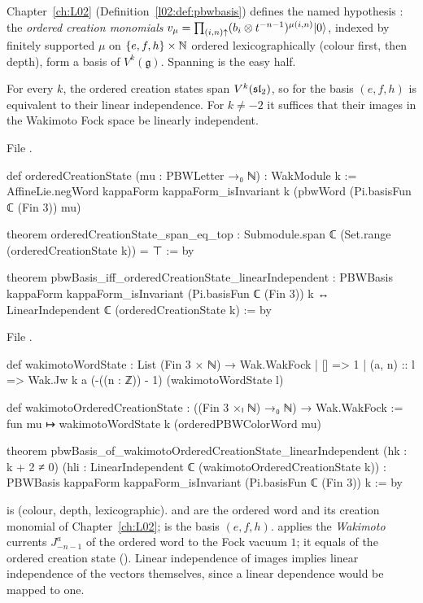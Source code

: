 Chapter~\ref{ch:L02} (Definition~\ref{l02:def:pbwbasis}) defines the named hypothesis
: the \emph{ordered creation monomials}
$v_\mu = \prod_{(i,n)\uparrow}(b_i\otimes t^{-n-1})^{\mu(i,n)}|0\rangle$, indexed by finitely supported
$\mu$ on $\{e,f,h\}\times{\mathbb{N}}$ ordered lexicographically (colour first, then depth), form a basis of
$V^k(\mathfrak g)$. Spanning is the easy half.

\begin{proposition}\label{l08:prop:pbwreduce}
For every $k$, the ordered creation states span $V^k(\mathfrak{sl}_2)$, so  for the basis
$(e,f,h)$ is equivalent to their linear independence. For $k\ne-2$ it suffices that their images in
the Wakimoto Fock space be linearly independent.
\end{proposition}

\noindent File .
\begin{leancode}
def orderedCreationState (mu : PBWLetter →₀ ℕ) : WakModule k :=
  AffineLie.negWord kappaForm kappaForm_isInvariant k
    (pbwWord (Pi.basisFun ℂ (Fin 3)) mu)

theorem orderedCreationState_span_eq_top :
    Submodule.span ℂ (Set.range (orderedCreationState k)) = ⊤ := by

theorem pbwBasis_iff_orderedCreationState_linearIndependent :
    PBWBasis kappaForm kappaForm_isInvariant (Pi.basisFun ℂ (Fin 3)) k ↔
      LinearIndependent ℂ (orderedCreationState k) := by
\end{leancode}
\noindent File .
\begin{leancode}
def wakimotoWordState : List (Fin 3 × ℕ) → Wak.WakFock
  | [] => 1
  | (a, n) :: l => Wak.Jw k a (-((n : ℤ)) - 1) (wakimotoWordState l)

def wakimotoOrderedCreationState : ((Fin 3 ×ₗ ℕ) →₀ ℕ) → Wak.WakFock :=
  fun mu ↦ wakimotoWordState k (orderedPBWColorWord mu)

theorem pbwBasis_of_wakimotoOrderedCreationState_linearIndependent
    (hk : k + 2 ≠ 0)
    (hli : LinearIndependent ℂ (wakimotoOrderedCreationState k)) :
    PBWBasis kappaForm kappaForm_isInvariant (Pi.basisFun ℂ (Fin 3)) k := by
\end{leancode}

\begin{dictionary}
 is  (colour, depth, lexicographic).  and 
are the ordered word and its creation monomial of Chapter~\ref{ch:L02}; 
is the basis $(e,f,h)$.  applies the \emph{Wakimoto} currents
$J^a_{-n-1}$ of the ordered word to the Fock vacuum $1$; it equals  of the ordered
creation state (\allowbreak{}). Linear independence of images implies linear
independence of the vectors themselves, since a linear dependence would be mapped to one.
\end{dictionary}

